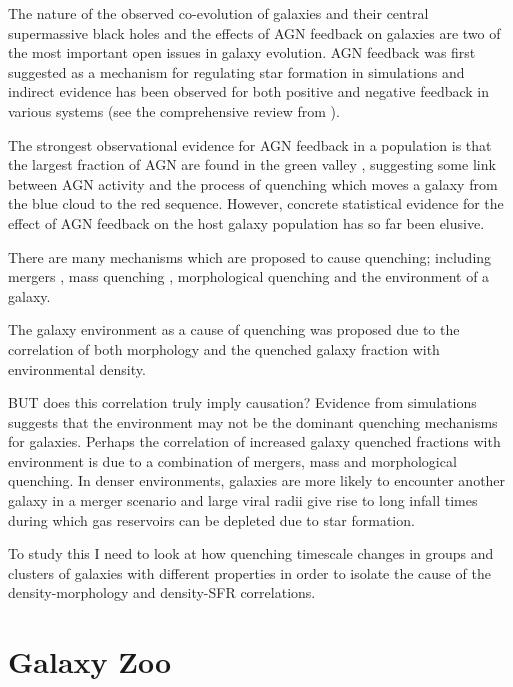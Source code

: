 The nature of the observed co-evolution of galaxies and their central supermassive black holes \citep{magorrian98, marconi03, haringrix04} and the effects of AGN feedback on galaxies are two of the most important open issues in galaxy evolution. AGN feedback was first suggested as a mechanism for regulating star formation in simulations \citep{silk98, Croton06, Bower06, somerville08} and indirect evidence has been observed for both positive and negative feedback in various systems (see the comprehensive review from \citealt{fabian12}). 

The strongest observational evidence for AGN feedback in a population is that the largest fraction of AGN are found in the green valley \citep{cowie08, Hickox09, schawinski10a}, suggesting some link between AGN activity and  the process of quenching which moves a galaxy from the blue cloud to the red sequence. However, concrete statistical evidence for the effect of AGN feedback on the host galaxy population has so far been elusive.

There are many mechanisms which are proposed to cause quenching; including mergers \citep{daddi10}, mass quenching \citep{kennicutt87, peng12}, morphological quenching \citep{?} and the environment of a galaxy.
 
 The galaxy environment as a cause of quenching was proposed due to the correlation of both morphology \citep{dressler80} and the quenched galaxy fraction \citep{?} with environmental density. 
 
 BUT does this correlation truly imply causation? Evidence from simulations \citep{?} suggests that the environment may not be the dominant quenching mechanisms for galaxies. Perhaps the correlation of increased galaxy quenched fractions with environment is due to a combination of mergers, mass and morphological quenching. In denser environments, galaxies are more likely to encounter another galaxy in a merger scenario and large viral radii give rise to long infall times during which gas reservoirs can be depleted due to star formation.
 
 To study this I need to look at how quenching timescale changes in groups and clusters of galaxies with different properties in order to isolate the cause of the density-morphology and density-SFR correlations. 

\section{Galaxy Zoo}

